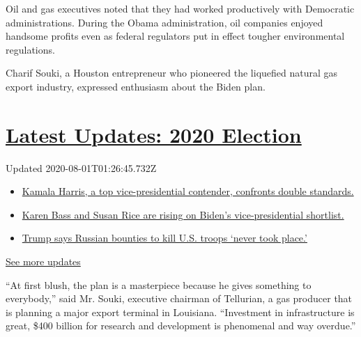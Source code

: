 Oil and gas executives noted that they had worked productively with
Democratic administrations. During the Obama administration, oil
companies enjoyed handsome profits even as federal regulators put in
effect tougher environmental regulations.

Charif Souki, a Houston entrepreneur who pioneered the liquefied natural
gas export industry, expressed enthusiasm about the Biden plan.

\hypertarget{latest-updates-2020-election}{%
\section{\texorpdfstring{\href{https://www.nytimes3xbfgragh.onion/2020/07/31/us/elections/biden-vs-trump.html?action=click\&pgtype=Article\&state=default\&region=MAIN_CONTENT_1\&context=storylines_live_updates}{Latest
Updates: 2020
Election}}{Latest Updates: 2020 Election}}\label{latest-updates-2020-election}}

Updated 2020-08-01T01:26:45.732Z

\begin{itemize}
\tightlist
\item
  \href{https://www.nytimes3xbfgragh.onion/2020/07/31/us/elections/biden-vs-trump.html?action=click\&pgtype=Article\&state=default\&region=MAIN_CONTENT_1\&context=storylines_live_updates\#link-29fdff45}{Kamala
  Harris, a top vice-presidential contender, confronts double
  standards.}
\item
  \href{https://www.nytimes3xbfgragh.onion/2020/07/31/us/elections/biden-vs-trump.html?action=click\&pgtype=Article\&state=default\&region=MAIN_CONTENT_1\&context=storylines_live_updates\#link-13ec3d9c}{Karen
  Bass and Susan Rice are rising on Biden's vice-presidential
  shortlist.}
\item
  \href{https://www.nytimes3xbfgragh.onion/2020/07/31/us/elections/biden-vs-trump.html?action=click\&pgtype=Article\&state=default\&region=MAIN_CONTENT_1\&context=storylines_live_updates\#link-49e9a016}{Trump
  says Russian bounties to kill U.S. troops `never took place.'}
\end{itemize}

\href{https://www.nytimes3xbfgragh.onion/2020/07/31/us/elections/biden-vs-trump.html?action=click\&pgtype=Article\&state=default\&region=MAIN_CONTENT_1\&context=storylines_live_updates}{See
more updates}

``At first blush, the plan is a masterpiece because he gives something
to everybody,'' said Mr. Souki, executive chairman of Tellurian, a gas
producer that is planning a major export terminal in Louisiana.
``Investment in infrastructure is great, \$400 billion for research and
development is phenomenal and way overdue.''

